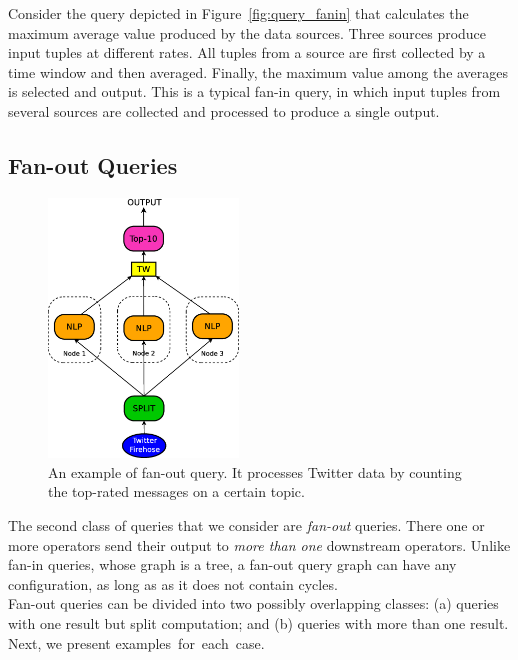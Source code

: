 \ex Consider the query depicted in Figure~\ref{fig:query_fanin} that calculates
the maximum average value produced by the data sources.
Three sources produce input tuples at different rates. All tuples from a source are first
collected by a time window and then averaged. Finally, the maximum value among the
averages is selected and output. This is a typical fan-in query, in which input tuples from several
sources are collected and processed to produce a single output.

\subsection*{Fan-out Queries} 
\label{sec:fan-out}

\begin{figure}[t]
	\centering
	\includegraphics[width=0.45\textwidth]{img/tesi/fan-out_mr_senza} 
	\caption{An example of fan-out query. It processes Twitter data by counting the top-rated messages on a
	certain topic.}
	\label{fig:fanout_mr2}
\end{figure}

The second class of queries that we consider are \textit{fan-out} queries. There one or more operators
send their output to \textit{more than one} downstream operators.
Unlike fan-in queries, whose graph is a tree, a fan-out query
graph can have any configuration, as long as as it does not contain cycles.\\
Fan-out queries can be divided into two possibly overlapping classes: (a) queries with one
result but split computation; and (b) queries with more than one result. Next, we present
examples~for~each~case.

